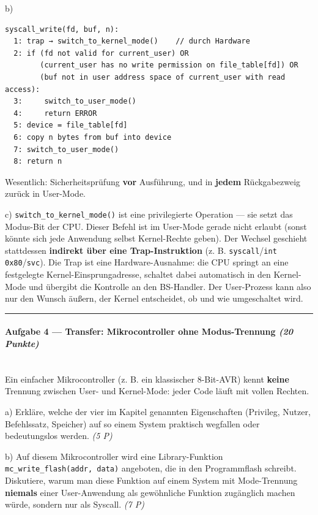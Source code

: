 \documentclass[11pt, a4paper]{article}
\begin{document}
b)

\begin{lstlisting}
syscall_write(fd, buf, n):
  1: trap → switch_to_kernel_mode()    // durch Hardware
  2: if (fd not valid for current_user) OR
        (current_user has no write permission on file_table[fd]) OR
        (buf not in user address space of current_user with read access):
  3:     switch_to_user_mode()
  4:     return ERROR
  5: device = file_table[fd]
  6: copy n bytes from buf into device
  7: switch_to_user_mode()
  8: return n
\end{lstlisting}

Wesentlich: Sicherheitsprüfung \textbf{vor} Ausführung, und in \textbf{jedem} Rückgabezweig zurück in User-Mode.


c) \texttt{switch\_to\_kernel\_mode()} ist eine privilegierte Operation — sie setzt das Modus-Bit der CPU. Dieser Befehl ist im User-Mode gerade nicht erlaubt (sonst könnte sich jede Anwendung selbst Kernel-Rechte geben). Der Wechsel geschieht stattdessen \textbf{indirekt über eine Trap-Instruktion} (z. B. \texttt{syscall}/\texttt{int 0x80}/\texttt{svc}). Die Trap ist eine Hardware-Ausnahme: die CPU springt an eine festgelegte Kernel-Einsprungadresse, schaltet dabei automatisch in den Kernel-Mode und übergibt die Kontrolle an den BS-Handler. Der User-Prozess kann also nur den Wunsch äußern, der Kernel entscheidet, ob und wie umgeschaltet wird.



\noindent\textcolor{rulegray}{\rule{\linewidth}{0.4pt}}


\paragraph{Aufgabe 4 — Transfer: Mikrocontroller ohne Modus-Trennung \textit{(20 Punkte)}}\mbox{}\\[2pt]

Ein einfacher Mikrocontroller (z. B. ein klassischer 8-Bit-AVR) kennt \textbf{keine} Trennung zwischen User- und Kernel-Mode: jeder Code läuft mit vollen Rechten.


a) Erkläre, welche der vier im Kapitel genannten Eigenschaften (Privileg, Nutzer, Befehlssatz, Speicher) auf so einem System praktisch wegfallen oder bedeutungslos werden. \textit{(5 P)}


b) Auf diesem Mikrocontroller wird eine Library-Funktion \texttt{mc\_write\_flash(addr, data)} angeboten, die in den Programmflash schreibt. Diskutiere, warum man diese Funktion auf einem System mit Mode-Trennung \textbf{niemals} einer User-Anwendung als gewöhnliche Funktion zugänglich machen würde, sondern nur als Syscall. \textit{(7 P)}
\end{document}
